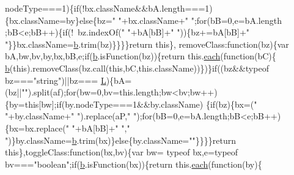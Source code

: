 \begin{DoxyCode}
      nodeType===1)\{\textcolor{keywordflow}{if}(!bx.className&&bA.length===1)\{bx.className=by\}\textcolor{keywordflow}{else}\{bz=\textcolor{stringliteral}{" "}+bx.className+\textcolor{stringliteral}{" "};\textcolor{keywordflow}{for}(bB=0,e=bA.length
      ;bB<e;bB++)\{\textcolor{keywordflow}{if}(!~bz.indexOf(\textcolor{stringliteral}{" "}+bA[bB]+\textcolor{stringliteral}{" "}))\{bz+=bA[bB]+\textcolor{stringliteral}{" "}\}\}bx.className=\hyperlink{docs_2_programmer's_manual_2html_2jquery_8js_aa4026ad5544b958e54ce5e106fa1c805}{b}.trim(bz)\}\}\}\}\textcolor{keywordflow}{return} \textcolor{keyword}{this}\},
      removeClass:\textcolor{keyword}{function}(bz)\{var bA,bw,bv,by,bx,bB,e;\textcolor{keywordflow}{if}(\hyperlink{docs_2_programmer's_manual_2html_2jquery_8js_aa4026ad5544b958e54ce5e106fa1c805}{b}.isFunction(bz))\{\textcolor{keywordflow}{return} this.\hyperlink{docs_2_programmer's_manual_2html_2jquery_8js_a871ff39db627c54c710a3e9909b8234c}{each}(\textcolor{keyword}{function}(bC)\{
      \hyperlink{docs_2_programmer's_manual_2html_2jquery_8js_aa4026ad5544b958e54ce5e106fa1c805}{b}(\textcolor{keyword}{this}).removeClass(bz.call(\textcolor{keyword}{this},bC,\textcolor{keyword}{this}.className))\})\}\textcolor{keywordflow}{if}((bz&&typeof bz===\textcolor{stringliteral}{"string"})||bz===
      \hyperlink{docs_2_programmer's_manual_2html_2jquery_8js_a38ee4c0b5f4fe2a18d0c783af540d253}{L})\{bA=(bz||\textcolor{stringliteral}{""}).split(af);\textcolor{keywordflow}{for}(bw=0,bv=this.length;bw<bv;bw++)\{by=\textcolor{keyword}{this}[bw];\textcolor{keywordflow}{if}(by.nodeType===1&&by.className)
      \{\textcolor{keywordflow}{if}(bz)\{bx=(\textcolor{stringliteral}{" "}+by.className+\textcolor{stringliteral}{" "}).replace(aP,\textcolor{stringliteral}{" "});\textcolor{keywordflow}{for}(bB=0,e=bA.length;bB<e;bB++)\{bx=bx.replace(\textcolor{stringliteral}{" "}+bA[bB]+\textcolor{stringliteral}{"
       "},\textcolor{stringliteral}{" "})\}by.className=\hyperlink{docs_2_programmer's_manual_2html_2jquery_8js_aa4026ad5544b958e54ce5e106fa1c805}{b}.trim(bx)\}\textcolor{keywordflow}{else}\{by.className=\textcolor{stringliteral}{""}\}\}\}\}\textcolor{keywordflow}{return} \textcolor{keyword}{this}\},toggleClass:\textcolor{keyword}{function}(bx,bv)\{var bw=
      typeof bx,e=typeof bv===\textcolor{stringliteral}{"boolean"};\textcolor{keywordflow}{if}(\hyperlink{docs_2_programmer's_manual_2html_2jquery_8js_aa4026ad5544b958e54ce5e106fa1c805}{b}.isFunction(bx))\{\textcolor{keywordflow}{return} this.\hyperlink{docs_2_programmer's_manual_2html_2jquery_8js_a871ff39db627c54c710a3e9909b8234c}{each}(\textcolor{keyword}{function}(by)\{

\end{DoxyCode}
